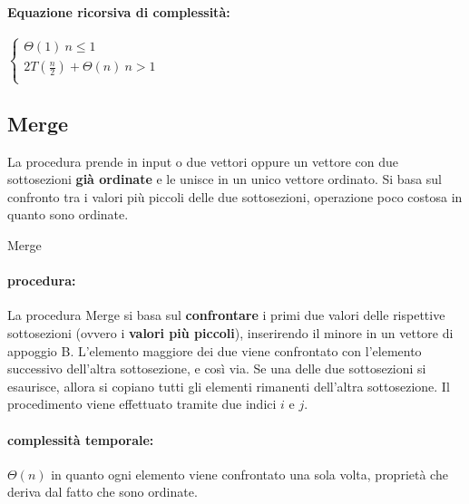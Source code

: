 \documentclass{article}
\begin{document}
\paragraph{Equazione ricorsiva di complessità:}
$\begin{cases}
    \Theta(1) \ n \leq 1\\
    2T(\frac{n}{2}) + \Theta(n) \ n > 1\\
\end{cases}$
\newpage
\hypertarget{merge}{} \subsection{Merge} %
La procedura prende in input o due vettori oppure un vettore con due sottosezioni \textbf{già ordinate} e le unisce in un unico vettore ordinato. 
Si basa sul confronto tra i valori più piccoli delle due sottosezioni, operazione poco costosa in quanto sono ordinate.

\begin{algorithm}[H]
\caption{Merge}
\end{algorithm}
\paragraph{procedura:}
La procedura Merge si basa sul \textbf{confrontare} i primi due valori delle rispettive sottosezioni (ovvero i \textbf{valori più piccoli}), inserirendo il minore in un vettore di appoggio B. L'elemento maggiore dei due viene 
confrontato con l'elemento successivo dell'altra sottosezione, e così via. Se una delle due sottosezioni si esaurisce, allora si copiano tutti gli elementi rimanenti dell'altra sottosezione. 
Il procedimento viene effettuato tramite due indici $i$ e $j$.

\paragraph{complessità temporale:} $\Theta(n)$ in quanto ogni elemento viene confrontato una sola volta, proprietà che deriva dal fatto che sono ordinate.
\end{document}
